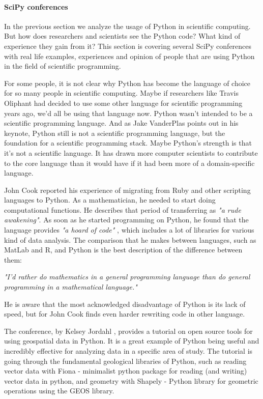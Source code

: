 \vspace{2mm}
\paragraph{SciPy conferences} 
\label{SciPy}
\vspace{3mm}

In the previous section we analyze the usage of Python in scientific computing. But how does researchers and scientists see the Python code? What kind of experience they gain from it? This section is covering several SciPy conferences with real life examples, experiences and opinion of people that are using Python in the field of scientific programming.

For some people, it is not clear why Python has become the language of choice for so many people in scientific computing. Maybe if researchers like Travis Oliphant had decided to use some other language for scientific programming years ago, we'd all be using that language now. Python wasn't intended to be a scientific programming language. And as Jake VanderPlas points out in his keynote, Python still is not a scientific programming language, but the foundation for a scientific programming stack. Maybe Python's strength is that it's not a scientific language. It has drawn more computer scientists to contribute to the core language than it would have if it had been more of a domain-specific language.

John Cook reported his experience of migrating from Ruby and other scripting languages to Python. As a mathematician, he needed to start doing computational functions. He describes that period of transferring as \textit{"a rude awakening"}.\cite{johnSciPy} As soon as he started programming on Python, he found that the language provides \textit{"a hoard of code"} \cite{johnSciPy}, which includes a lot of libraries for various kind of data analysis. The comparison that he makes between languages, such as MatLab and R, and Python is the best description of the difference between them:

\textit{"I'd rather do mathematics in a general programming language than do general programming in a mathematical language."}

He is aware that the most acknowledged disadvantage of Python is its lack of speed, but for John Cook finds even harder rewriting code in other language. 

The conference, by Kelsey Jordahl \cite{efficientPython}, provides a tutorial on open source tools for using geospatial data in Python. It is a great example of Python being useful and incredibly effective for analyzing data in a specific area of study. The tutorial is going through the fundamental geological libraries of Python, such as reading vector data with Fiona - minimalist python package for reading (and writing) vector data in python, and geometry with Shapely - Python library for geometric operations using the GEOS library. 

